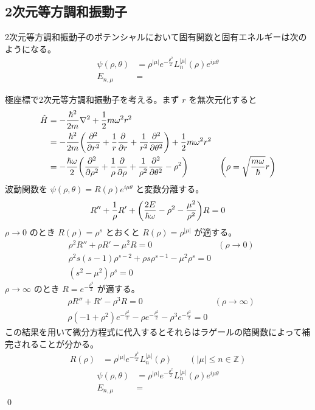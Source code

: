 \documentclass[uplatex,dvipdfmx,a4paper,11pt]{jlreq}
\makeatletter
\newcommand{\ZZ}{\mathbb{Z}}
\numberwithin{equation}{section}
\theoremstyle{definition}
\renewenvironment{proof}[1][\proofname]{\par
  \normalfont
  \topsep6\p@\@plus6\p@ \trivlist
  \item[\hskip\labelsep{\bfseries #1}\@addpunct{\bfseries}]\ignorespaces\quad\par
}{%
  \qed\endtrivlist\@endpefalse
}
\renewcommand\proofname{証明}
\makeatother
\begin{document}
\subsection{2次元等方調和振動子}
\begin{proposition}
  2次元等方調和振動子のポテンシャルにおいて固有関数と固有エネルギーは次のようになる。
  \begin{align}
    \psi(\rho, \theta) & = \rho^{|\mu|}e^{-\frac{\rho^2}{2}}L_n^{|\mu|}(\rho)e^{i\mu\theta} \\
    E_{n, \mu}         & =
  \end{align}
\end{proposition}
\begin{proof}
  極座標で2次元等方調和振動子を考える。まず $r$ を無次元化すると
  \begin{align}
    \hat{H} & = -\frac{\hbar^2}{2m}\laplacian + \frac{1}{2}m\omega^2r^2                                                                                                        \\
            & = -\frac{\hbar^2}{2m}\qty(\pdv[2]{r} + \frac{1}{r}\pdv{r} + \frac{1}{r^2}\pdv[2]{\theta}) + \frac{1}{2}m\omega^2r^2                                              \\
            & = -\frac{\hbar\omega}{2}\qty(\pdv[2]{\rho} + \frac{1}{\rho}\pdv{\rho} + \frac{1}{\rho^2}\pdv[2]{\theta} - \rho^2)   & \qty(\rho = \sqrt{\frac{m\omega}{\hbar}}r)
  \end{align}
  波動関数を $\psi(\rho, \theta) = R(\rho)e^{i\mu\theta}$ と変数分離する。
  \begin{align}
    R'' + \frac{1}{\rho}R' + \qty(\frac{2E}{\hbar\omega} - \rho^2 - \frac{\mu^2}{\rho^2})R = 0
  \end{align}
  $\rho\to 0$ のとき $R(\rho) = \rho^s$ とおくと $R(\rho) = \rho^{|\mu|}$ が適する。
  \begin{align}
     & \rho^2R'' + \rho R' - \mu^2R = 0                              & (\rho\to 0) \\
     & \rho^2s(s - 1)\rho^{s-2} + \rho s\rho^{s-1} - \mu^2\rho^s = 0               \\
     & (s^2 - \mu^2)\rho^s = 0
  \end{align}
  $\rho\to\infty$ のとき $R = e^{-\frac{\rho^2}{2}}$ が適する。
  \begin{align}
     & \rho R'' + R' - \rho^3R = 0                                                                            & (\rho\to\infty) \\
     & \rho (-1 + \rho^2)e^{-\frac{\rho^2}{2}} - \rho e^{-\frac{\rho^2}{2}} - \rho^3e^{-\frac{\rho^2}{2}} = 0
  \end{align}
  この結果を用いて微分方程式に代入するとそれらはラゲールの陪関数によって補完されることが分かる。
  \begin{align}
    R(\rho) & = \rho^{|\mu|}e^{-\frac{\rho^2}{2}}L_n^{|\mu|}(\rho) \qquad (|\mu|\leq n\in\ZZ)
  \end{align}
  \begin{align}
    \psi(\rho, \theta) & = \rho^{|\mu|}e^{-\frac{\rho^2}{2}}L_n^{|\mu|}(\rho)e^{i\mu\theta} \\
    E_{n, \mu}         & =
  \end{align}
\end{proof}
\end{document}
